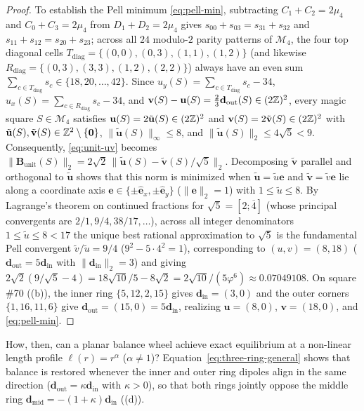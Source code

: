 \begin{proof}
To establish the Pell minimum \eqref{eq:pell-min}, subtracting $C_1+C_2=2\mu_4$ and $C_0+C_3=2\mu_4$ from $D_1+D_2=2\mu_4$ gives $s_{00}+s_{03}=s_{31}+s_{32}$ and $s_{11}+s_{12}=s_{20}+s_{23}$; across all $24$ modulo-$2$ parity patterns of $\mathcal M_4$, the four top diagonal cells $T_{\mathrm{diag}}=\{(0,0),(0,3),(1,1),(1,2)\}$ (and likewise $R_{\mathrm{diag}}=\{(0,3),(3,3),(1,2),(2,2)\}$) always have an even sum $\sum_{c\in T_{\mathrm{diag}}}s_c\in\{18,20,\dots,42\}$. Since $u_y(S)=\sum_{c\in T_{\mathrm{diag}}}s_c-34$, $u_x(S)=\sum_{c\in R_{\mathrm{diag}}}s_c-34$, and $\mathbf v(S)-\mathbf u(S)=\frac23\mathbf d_{\mathrm{out}}(S)\in(2\mathbb{Z})^2$, every magic square $S\in\mathcal M_4$ satisfies $\mathbf u(S)=2\tilde{\mathbf u}(S)\in(2\mathbb{Z})^2$ and $\mathbf v(S)=2\tilde{\mathbf v}(S)\in(2\mathbb{Z})^2$ with $\tilde{\mathbf u}(S),\tilde{\mathbf v}(S)\in\mathbb{Z}^2\setminus\{\mathbf 0\}$, $\|\tilde{\mathbf u}(S)\|_\infty\le 8$, and $\|\tilde{\mathbf u}(S)\|_2\le 4\sqrt{5}<9$. Consequently, \eqref{eq:unit-uv} becomes $\|\mathbf B_{\mathrm{unit}}(S)\|_2=2\sqrt{2}\,\|\tilde{\mathbf u}(S)-\tilde{\mathbf v}(S)/\sqrt{5}\|_2$. Decomposing $\tilde{\mathbf v}$ parallel and orthogonal to $\tilde{\mathbf u}$ shows that this norm is minimized when $\tilde{\mathbf u}=\tilde u\mathbf e$ and $\tilde{\mathbf v}=\tilde v\mathbf e$ lie along a coordinate axis $\mathbf e\in\{\pm\hat{\mathbf e}_x,\pm\hat{\mathbf e}_y\}$ ($\|\mathbf e\|_2=1$) with $1\le\tilde u\le 8$. By Lagrange's theorem on continued fractions for $\sqrt{5}=[2;\overline{4}]$ (whose principal convergents are $2/1,9/4,38/17,\dots$), across all integer denominators $1\le\tilde u\le 8<17$ the unique best rational approximation to $\sqrt{5}$ is the fundamental Pell convergent $\tilde v/\tilde u=9/4$ ($9^2-5\cdot 4^2=1$), corresponding to $(u,v)=(8,18)$ ($\mathbf d_{\mathrm{out}}=5\mathbf d_{\mathrm{in}}$ with $\|\mathbf d_{\mathrm{in}}\|_2=3$) and giving $2\sqrt{2}(9/\sqrt{5}-4)=18\sqrt{10}/5-8\sqrt{2}=2\sqrt{10}/(5\varphi^6)\approx0.07049108$. On square \#70 ((b)), the inner ring $\{5,12,2,15\}$ gives $\mathbf d_{\mathrm{in}}=(3,0)$ and the outer corners $\{1,16,11,6\}$ give $\mathbf d_{\mathrm{out}}=(15,0)=5\mathbf d_{\mathrm{in}}$, realizing $\mathbf u=(8,0)$, $\mathbf v=(18,0)$, and \eqref{eq:pell-min}.
\end{proof}

How, then, can a planar balance wheel achieve exact equilibrium at a non-linear length profile $\ell(r)=r^\alpha$ ($\alpha\ne1$)? Equation~\eqref{eq:three-ring-general} shows that balance is restored whenever the inner and outer ring dipoles align in the same direction ($\mathbf d_{\mathrm{out}}=\kappa\mathbf d_{\mathrm{in}}$ with $\kappa>0$), so that both rings jointly oppose the middle ring $\mathbf d_{\mathrm{mid}}=-(1+\kappa)\mathbf d_{\mathrm{in}}$ ((d)).

